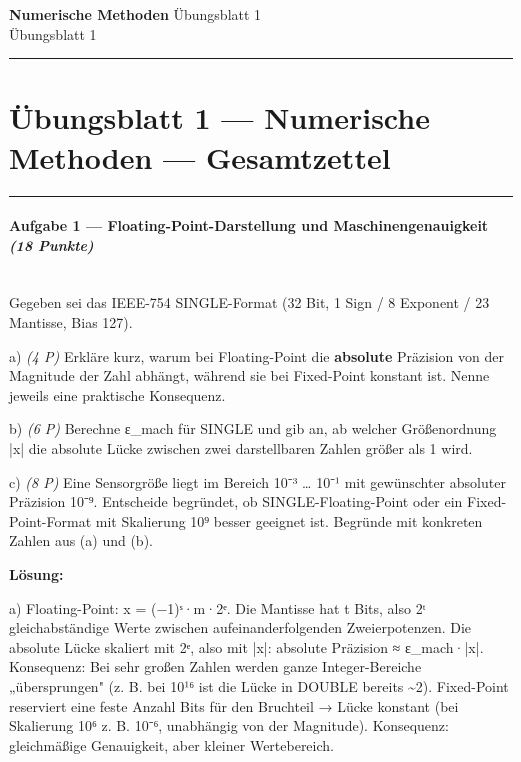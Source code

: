 \documentclass[11pt, a4paper]{article}
\providecommand{\nichttitle}{Übungsblatt}
\providecommand{\nichtsubtitle}{}
\renewcommand{\nichttitle}{Numerische Methoden}
\renewcommand{\nichtsubtitle}{Übungsblatt 1}
\begin{document}
\begin{center}
{\Large\bfseries\color{accent}\nichttitle}
\ifx\nichtsubtitle\empty\else
  \\[2pt]{\normalsize\color{accent!80!black}\nichtsubtitle}
\fi
\\[2pt]
\color{accent}\rule{0.4\linewidth}{0.8pt}\color{black}
\end{center}
\vspace{4pt}


\section{Übungsblatt 1 — Numerische Methoden — Gesamtzettel}


\noindent\textcolor{rulegray}{\rule{\linewidth}{0.4pt}}


\paragraph{Aufgabe 1 — Floating-Point-Darstellung und Maschinengenauigkeit \textit{(18 Punkte)}}\mbox{}\\[2pt]

Gegeben sei das IEEE-754 SINGLE-Format (32 Bit, 1 Sign / 8 Exponent / 23 Mantisse, Bias 127).


a) \textit{(4 P)} Erkläre kurz, warum bei Floating-Point die \textbf{absolute} Präzision von der Magnitude der Zahl abhängt, während sie bei Fixed-Point konstant ist. Nenne jeweils eine praktische Konsequenz.


b) \textit{(6 P)} Berechne ε\_mach für SINGLE und gib an, ab welcher Größenordnung |x| die absolute Lücke zwischen zwei darstellbaren Zahlen größer als 1 wird.


c) \textit{(8 P)} Eine Sensorgröße liegt im Bereich 10⁻³ … 10⁻¹ mit gewünschter absoluter Präzision 10⁻⁹. Entscheide begründet, ob SINGLE-Floating-Point oder ein Fixed-Point-Format mit Skalierung 10⁹ besser geeignet ist. Begründe mit konkreten Zahlen aus (a) und (b).


\textbf{Lösung:}


a) Floating-Point: x = (−1)ˢ·m·2ᵉ. Die Mantisse hat t Bits, also 2ᵗ gleichabständige Werte zwischen aufeinanderfolgenden Zweierpotenzen. Die absolute Lücke skaliert mit 2ᵉ, also mit |x|: absolute Präzision ≈ ε\_mach·|x|. Konsequenz: Bei sehr großen Zahlen werden ganze Integer-Bereiche „übersprungen" (z. B. bei 10¹⁶ ist die Lücke in DOUBLE bereits \textasciitilde{}2). Fixed-Point reserviert eine feste Anzahl Bits für den Bruchteil → Lücke konstant (bei Skalierung 10⁶ z. B. 10⁻⁶, unabhängig von der Magnitude). Konsequenz: gleichmäßige Genauigkeit, aber kleiner Wertebereich.
\end{document}
